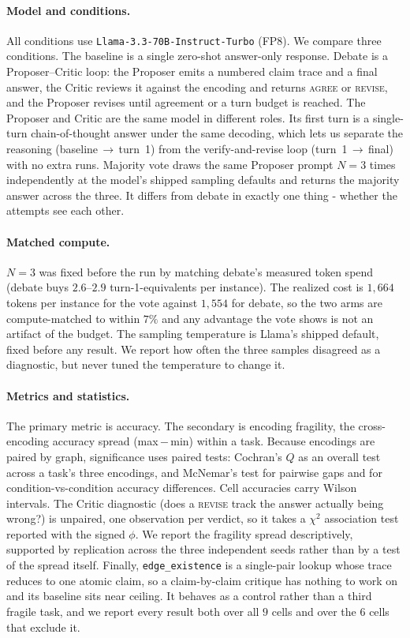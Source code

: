\documentclass[11pt]{article}
\begin{document}
\paragraph{Model and conditions.}
All conditions use \texttt{Llama-3.3-70B-Instruct-Turbo} (FP8). We compare three
conditions. The baseline is a
single zero-shot answer-only response. Debate is a Proposer--Critic loop:
the Proposer emits a numbered claim trace and a final answer, the Critic reviews it
against the encoding and returns \textsc{agree} or \textsc{revise}, and the Proposer
revises until agreement or a turn budget is reached. The Proposer and Critic are the
same model in different roles. Its first turn is a single-turn
chain-of-thought answer under the same decoding, which lets us separate the
reasoning (baseline\,$\rightarrow$\,turn~1) from the
verify-and-revise loop (turn~1\,$\rightarrow$\,final) with no extra runs.
Majority vote draws the same Proposer prompt $N{=}3$ times independently at
the model's shipped sampling defaults and returns the majority answer across the
three. It differs from debate in exactly one thing - whether the attempts see each
other.

\paragraph{Matched compute.}
$N{=}3$ was fixed before the run by matching debate's measured token spend
(debate buys $2.6$--$2.9$ turn-1-equivalents per instance). The realized cost is
$1{,}664$ tokens per instance for the vote against $1{,}554$ for debate, so the two
arms are compute-matched to within $7\%$ and any advantage the vote shows is not an
artifact of the budget. The sampling temperature is Llama's shipped
default, fixed before any result. We report how often the three samples disagreed as
a diagnostic, but never tuned the temperature to change it.

\paragraph{Metrics and statistics.}
The primary metric is accuracy. The secondary is encoding fragility, the
cross-encoding accuracy spread (max\,$-$\,min) within a task. Because encodings are
paired by graph, significance uses paired tests: Cochran's $Q$ as an overall test across
a task's three encodings, and McNemar's test for pairwise gaps and for
condition-vs-condition accuracy differences. Cell accuracies carry Wilson intervals.
The Critic diagnostic (does a \textsc{revise} track the answer actually being
wrong?) is unpaired, one observation per verdict, so it takes a $\chi^2$ association
test reported with the signed $\phi$. We report the fragility spread descriptively,
supported by replication across the three independent seeds rather than by a test of
the spread itself. Finally, \texttt{edge\_existence} is a single-pair lookup whose
trace reduces to one atomic claim, so a claim-by-claim critique has nothing to work
on and its baseline sits near ceiling. It behaves as a control rather than a
third fragile task, and we report every result both over all $9$ cells and over the
$6$ cells that exclude it.
\end{document}
